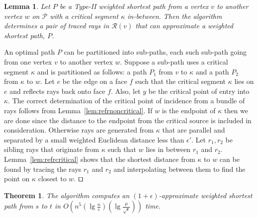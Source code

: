 \documentclass[11pt]{article}
\def\qed{\hbox{\rlap{$\sqcap$}$\sqcup$}}
\def\calP{\mathcal{P}}
\def\calR{\mathcal{R}}
\newtheorem{theorem}{Theorem}[section]
\newtheorem{lemma}{Lemma}[section]
\newenvironment{proof}{\par\noindent{\bf Proof:}}{\mbox{}\hfill$\qed$\\}
\begin{document}
\begin{lemma}
\label{lem:refrcritical-find}
Let $P$ be a Type-II weighted shortest path from a vertex $v$ to another vertex $w$ on $\calP$ with a critical segment ${\kappa}$ in-between.
Then the algorithm determines a pair of traced rays  in $\calR(v)$ that can approximate a weighted shortest path, $P$. 
\end{lemma}
\begin{proof}
An optimal path $P$ can be partitioned into sub-paths, each such sub-path going from one vertex $v$ to another vertex $w$. 
Suppose a sub-path uses a critical segment $\kappa$ and is partitioned as follows: a path $P_1$ from $v$ to $\kappa$ and a path $P_2$ from $\kappa$ to $w$.
Let $e$ be the edge on a face $f$ such that the critical segment $\kappa$ lies  on $e$ and reflects rays back onto face $f$. 
Also, let $y$ be the critical point of entry into $\kappa$.
The correct determination of the critical point of incidence from a bundle of rays follows from
Lemma~\ref{lem:refrnoncritical}.
If $w$ is the endpoint of $\kappa$ then we are done since the distance to the endpoint from the critical source is included in consideration.
Otherwise rays are generated from  $\kappa$ that are parallel and separated by a small weighted Euclidean distance  less than $\epsilon'$.
Let $r_1, r_2$ be sibling rays that originate from $\kappa$ such that $w$ lies in between $r_1$ and $r_2$.
Lemma~\ref{lem:refrcritical} shows that the shortest distance from $\kappa$ to $w$ can
be found by tracing the rays $r_1$ and $r_2$ and interpolating between them to find the  point
on $\kappa$ closest to $w$.
\end{proof}

\begin{theorem}
\label{thm:timecompl} 
The algorithm computes an $(1+\epsilon)$-approximate weighted shortest path from $s$ to $t$ in 
$O(n^5(\lg{\frac{n}{\epsilon}})(\lg{\frac{\mu}{\sqrt{\epsilon}}}))$ time. 
\end{theorem}
\end{document}

